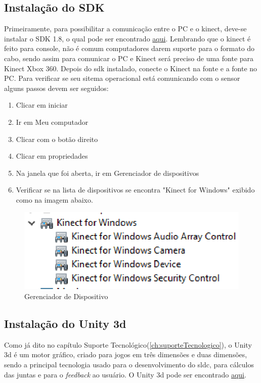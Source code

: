 \subsection{Instalação do SDK}
  Primeiramente, para possibilitar a comunicação entre o PC e o kinect, deve-se
instalar o SDK 1.8, o qual pode ser encontrado \href{https://www.microsoft.com/en-us/download/details.aspx?id=40278}{aqui}.
  Lembrando que o kinect é feito para console, não é comum computadores darem suporte para o formato do
cabo, sendo assim para comunicar o PC e Kinect será preciso de uma fonte para Kinect Xbox 360.
  Depois do sdk instalado, conecte o Kinect na fonte e a fonte no PC. Para verificar se seu sitema operacional
está comunicando com o sensor alguns passos devem ser seguidos:

\begin{enumerate}
  \item Clicar em iniciar
  \item Ir em Meu computador
  \item Clicar com o botão direito
  \item Clicar em propriedades
  \item Na janela que foi aberta, ir em Gerenciador de dispositivos
  \item Verificar se na lista de dispositivos se encontra "Kinect for Windows" exibido como na imagem abaixo.
\end{enumerate}


\begin{figure}[!h]
\centering
\includegraphics [keepaspectratio=true,scale=0.60]{figuras/gerenciadorDispositivo.eps}

\caption{Gerenciador de Dispositivo}
\label{gerenciadorDispositivo}
\end{figure}

\subsection{Instalação do Unity 3d}\label{sub:instalacaoUnity}
  Como já dito no capítulo Suporte Tecnológico(\ref{ch:suporteTecnologico}), o Unity 3d é um motor gráfico, criado para jogos em três dimensões e duas dimensões,
sendo a principal tecnologia usado para o desenvolvimento do sldc, para cálculos das juntas e para o \textit{feedback} ao usuário.
O Unity 3d pode ser encontrado \href{https://unity3d.com/pt/get-unity/download}{aqui}.


